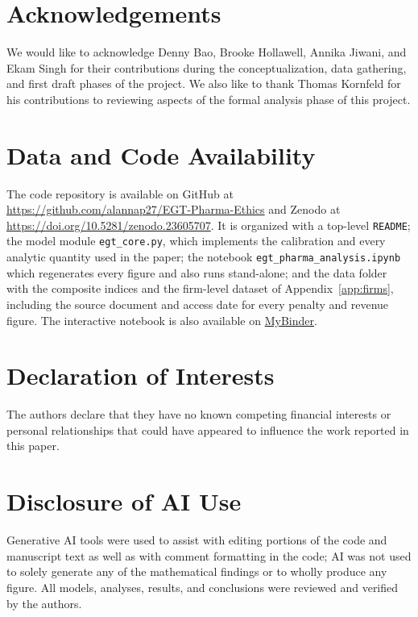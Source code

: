 \documentclass[10pt]{article}
\begin{document}
\section*{Acknowledgements}
We would like to acknowledge Denny Bao, Brooke Hollawell, Annika Jiwani, and Ekam Singh for their contributions during the conceptualization, data gathering, and first draft phases of the project. We also like to thank Thomas Kornfeld for his contributions to reviewing aspects of the formal analysis phase of this project.

\section*{Data and Code Availability}
The code repository is available on GitHub at \url{https://github.com/alannap27/EGT-Pharma-Ethics}
and Zenodo at \url{https://doi.org/10.5281/zenodo.23605707}.
It is organized with a top-level \texttt{README}; the model module \texttt{egt\_core.py}, which implements the calibration and every analytic quantity used in the paper; the notebook \texttt{egt\_pharma\_analysis.ipynb} which regenerates every figure and also runs stand-alone; and the data folder with the composite indices and the firm-level dataset of Appendix~\ref{app:firms}, including the source document and access date for every penalty and revenue figure.
The interactive notebook is also available on \href{https://mybinder.org/v2/gh/alannap27/EGT-Pharma-Ethics/HEAD?urlpath=%2Fdoc%2Ftree%2Finteractive_dashboard.ipynb}{MyBinder}.

\section*{Declaration of Interests}
The authors declare that they have no known competing financial interests or personal relationships that could have appeared to influence the work reported in this paper.

\section*{Disclosure of AI Use}
Generative AI tools were used to assist with editing portions of the code and manuscript text as well as with comment formatting in the code; AI was not used to solely generate any of the mathematical findings or to wholly produce any figure. All models, analyses, results, and conclusions were reviewed and verified by the authors.

\printbibliography
\end{document}
